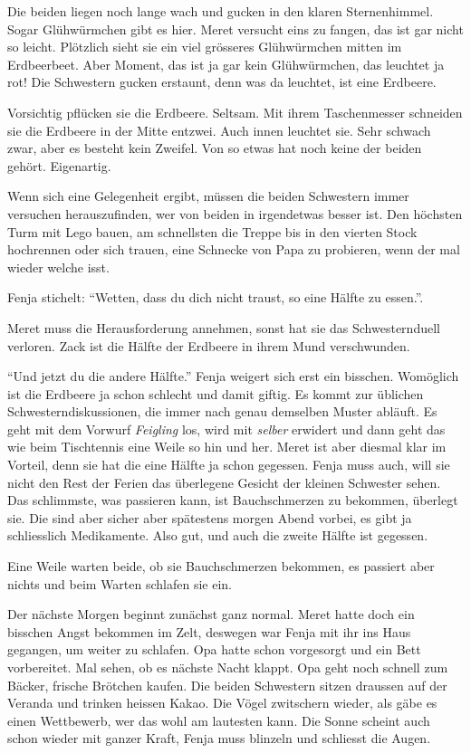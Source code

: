 Die beiden liegen noch lange wach und gucken in den klaren Sternenhimmel. Sogar Glühwürmchen gibt es hier. Meret versucht eins zu fangen, das ist gar nicht so leicht. Plötzlich sieht sie ein viel grösseres Glühwürmchen mitten im Erdbeerbeet. Aber Moment, das ist ja gar kein Glühwürmchen, das leuchtet ja rot! Die Schwestern gucken erstaunt, denn was da leuchtet, ist eine Erdbeere.

Vorsichtig pflücken sie die Erdbeere. Seltsam. Mit ihrem Taschenmesser schneiden sie die Erdbeere in der Mitte entzwei. Auch innen leuchtet sie. Sehr schwach zwar, aber es besteht kein Zweifel. Von so etwas hat noch keine der beiden gehört. Eigenartig. 

Wenn sich eine Gelegenheit ergibt, müssen die beiden Schwestern immer versuchen herauszufinden, wer von beiden in irgendetwas besser ist. Den höchsten Turm mit Lego bauen, am schnellsten die Treppe bis in den vierten Stock hochrennen oder sich trauen, eine Schnecke von Papa zu probieren, wenn der mal wieder welche isst. 

Fenja stichelt: \enquote{Wetten, dass du dich nicht traust, so eine Hälfte zu essen.}. 

Meret muss die Herausforderung annehmen, sonst hat sie das Schwesternduell verloren. Zack ist die Hälfte der Erdbeere in ihrem Mund verschwunden.

\enquote{Und jetzt du die andere Hälfte.} Fenja weigert sich erst ein bisschen. Womöglich ist die Erdbeere ja schon schlecht und damit giftig. Es kommt zur üblichen Schwesterndiskussionen, die immer nach genau demselben Muster abläuft. Es geht mit dem Vorwurf \textit{Feigling} los, wird mit \textit{selber} erwidert und dann geht das wie beim Tischtennis eine Weile so hin und her. Meret ist aber diesmal klar im Vorteil, denn sie hat die eine Hälfte ja schon gegessen. Fenja muss auch, will sie nicht den Rest der Ferien das überlegene Gesicht der kleinen Schwester sehen. Das schlimmste, was passieren kann, ist Bauchschmerzen zu bekommen, überlegt sie. Die sind aber sicher aber spätestens morgen Abend vorbei, es gibt ja schliesslich Medikamente. Also gut, und auch die zweite Hälfte ist gegessen.

Eine Weile warten beide, ob sie Bauchschmerzen bekommen, es passiert aber nichts und beim Warten schlafen sie ein.

\begin{center}
\end{center}

Der nächste Morgen beginnt zunächst ganz normal. Meret hatte doch ein bisschen Angst bekommen im Zelt, deswegen war Fenja mit ihr ins Haus gegangen, um weiter zu schlafen. Opa hatte schon vorgesorgt und ein Bett vorbereitet. Mal sehen, ob es nächste Nacht klappt. Opa geht noch schnell zum Bäcker, frische Brötchen kaufen. Die beiden Schwestern sitzen draussen auf der Veranda und trinken heissen Kakao. Die Vögel zwitschern wieder, als gäbe es einen Wettbewerb, wer das wohl am lautesten kann. Die Sonne scheint auch schon wieder mit ganzer Kraft, Fenja muss blinzeln und schliesst die Augen.

